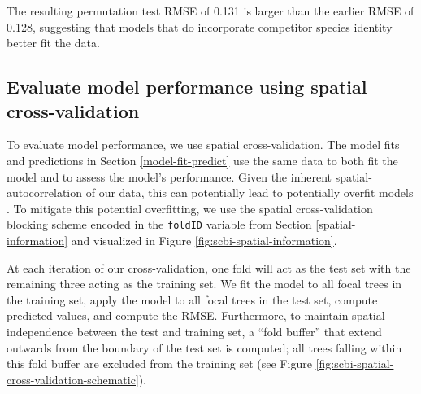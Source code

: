 \documentclass[12pt]{article}
\newenvironment{Shaded}{\begin{snugshade}}{\end{snugshade}}
\newcommand{\CommentTok}[1]{\textcolor[rgb]{0.56,0.35,0.01}{\textit{#1}}}
\newcommand{\DataTypeTok}[1]{\textcolor[rgb]{0.13,0.29,0.53}{#1}}
\newcommand{\KeywordTok}[1]{\textcolor[rgb]{0.13,0.29,0.53}{\textbf{#1}}}
\newcommand{\NormalTok}[1]{#1}
\newcommand{\OperatorTok}[1]{\textcolor[rgb]{0.81,0.36,0.00}{\textbf{#1}}}
\newcommand{\StringTok}[1]{\textcolor[rgb]{0.31,0.60,0.02}{#1}}
\begin{document}
\begin{Shaded}
\end{Shaded}

The resulting permutation test RMSE of 0.131 is larger than the earlier
RMSE of 0.128, suggesting that models that do incorporate competitor
species identity better fit the data.

\hypertarget{spatial-cross-validation}{%
\subsection{Evaluate model performance using spatial
cross-validation}\label{spatial-cross-validation}}

To evaluate model performance, we use spatial cross-validation. The
model fits and predictions in Section \ref{model-fit-predict} use the
same data to both fit the model and to assess the model's performance.
Given the inherent spatial-autocorrelation of our data, this can
potentially lead to potentially overfit models
\citep{roberts_cross-validation_2017}. To mitigate this potential
overfitting, we use the spatial cross-validation blocking scheme encoded
in the \texttt{foldID} variable from Section \ref{spatial-information}
and visualized in Figure \ref{fig:scbi-spatial-information}.

At each iteration of our cross-validation, one fold will act as the test
set with the remaining three acting as the training set. We fit the
model to all focal trees in the training set, apply the model to all
focal trees in the test set, compute predicted values, and compute the
RMSE. Furthermore, to maintain spatial independence between the test and
training set, a ``fold buffer'' that extend outwards from the boundary
of the test set is computed; all trees falling within this fold buffer
are excluded from the training set (see Figure
\ref{fig:scbi-spatial-cross-validation-schematic}).
\end{document}

